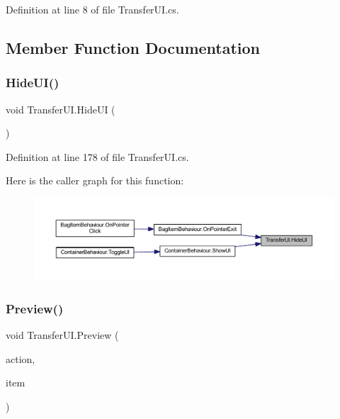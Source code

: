 Definition at line 8 of file Transfer\+U\+I.\+cs.



\subsection{Member Function Documentation}
\mbox{\label{class_transfer_u_i_a5c4b5956098b374e40ea084d7fbe7739}} 
\subsubsection{\texorpdfstring{HideUI()}{HideUI()}}
{\footnotesize\ttfamily void Transfer\+U\+I.\+Hide\+UI (\begin{DoxyParamCaption}{ }\end{DoxyParamCaption})}



Definition at line 178 of file Transfer\+U\+I.\+cs.

Here is the caller graph for this function\+:
\nopagebreak
\begin{figure}[H]
\begin{center}
\leavevmode
\includegraphics[width=350pt]{class_transfer_u_i_a5c4b5956098b374e40ea084d7fbe7739_icgraph}
\end{center}
\end{figure}
\mbox{\label{class_transfer_u_i_a9d2e7c3708193e3d51fe8539f9c41a75}} 
\subsubsection{\texorpdfstring{Preview()}{Preview()}\hspace{0.1cm}{\footnotesize\ttfamily [1/2]}}
{\footnotesize\ttfamily void Transfer\+U\+I.\+Preview (\begin{DoxyParamCaption}\item[{\mbox{\hyperlink{class_bag_behaviour_aeafbbbda3c9a34d1a73647a8b274788c}{Bag\+Behaviour.\+Actions}}}]{action,  }\item[{\mbox{\hyperlink{class_base_item}{Base\+Item}}}]{item }\end{DoxyParamCaption})}



